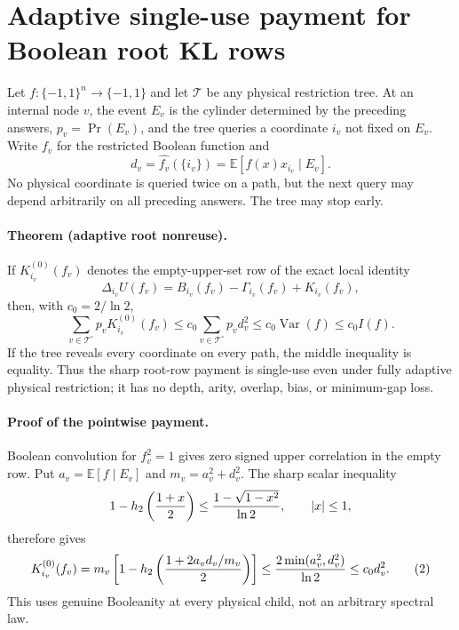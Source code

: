 \section*{Adaptive single-use payment for Boolean root KL rows}

Let $f:\{-1,1\}^n\to\{-1,1\}$ and let $\mathcal T$ be any physical
restriction tree.  At an internal node $v$, the event $E_v$ is the
cylinder determined by the preceding answers, $p_v=\Pr(E_v)$, and the
tree queries a coordinate $i_v$ not fixed on $E_v$.  Write $f_v$ for the
restricted Boolean function and
\[
 d_v=\widehat {f_v}(\{i_v\})
     =\mathbb E[f(x)x_{i_v}\mid E_v].
\]
No physical coordinate is queried twice on a path, but the next query may
depend arbitrarily on all preceding answers.  The tree may stop early.

\paragraph{Theorem (adaptive root nonreuse).}
If $K_{i_v}^{(0)}(f_v)$ denotes the empty-upper-set row of the exact local
identity
\[
 \Delta_{i_v}U(f_v)=B_{i_v}(f_v)-\Gamma_{i_v}(f_v)
                     +K_{i_v}(f_v),
\]
then, with $c_0=2/\ln2$,
\[
 \boxed{\sum_{v\in\mathcal T^\circ}p_vK_{i_v}^{(0)}(f_v)
 \le c_0\sum_{v\in\mathcal T^\circ}p_vd_v^2
 \le c_0\operatorname {Var}(f)\le c_0 I(f).}       \tag{1}
\]
If the tree reveals every coordinate on every path, the middle inequality
is equality.  Thus the sharp root-row payment is single-use even under
fully adaptive physical restriction; it has no depth, arity, overlap,
bias, or minimum-gap loss.

\paragraph{Proof of the pointwise payment.}
Boolean convolution for $f_v^2=1$ gives zero signed upper correlation in
the empty row.  Put $a_v=\mathbb E[f\mid E_v]$ and
$m_v=a_v^2+d_v^2$.  The sharp scalar inequality
\[
1-h_2\left({1+x\over2}\right)
\le {1-\sqrt{1-x^2}\over\ln2},\qquad |x|\le1,
\]
therefore gives
\[
K_{i_v}^{(0)}(f_v)
=m_v\left[1-h_2\left({1+2a_vd_v/m_v\over2}\right)\right]
\le {2\min(a_v^2,d_v^2)\over\ln2}
\le c_0d_v^2.                                      \tag{2}
\]
This uses genuine Booleanity at every physical child, not an arbitrary
spectral law.

